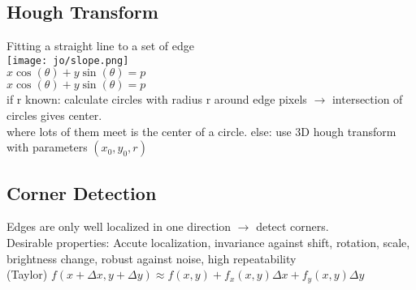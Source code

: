 \subsection*{Hough Transform}
Fitting a straight line to a set of edge\\
\texttt{[image: jo/slope.png]}\\
 $x \cos(\theta) + y \sin(\theta) = p$\\
 $x \cos(\theta) + y \sin(\theta) = p$\\
 if r known: calculate circles with radius r around edge pixels $\rightarrow$ intersection of circles gives center.\\ where lots of them meet is the center of a circle. else: use 3D hough transform with parameters $(x_0, y_0, r)$
\subsection*{Corner Detection}
Edges are only well localized in one direction $\rightarrow$ detect corners.\\
Desirable properties: Accute localization, invariance against shift, rotation, scale, brightness change, robust against noise, high repeatability\\
 (Taylor) $f(x + \Delta x, y + \Delta y) \approx f(x, y) + f_x(x, y) \Delta x + f_y(x, y)\Delta y$
